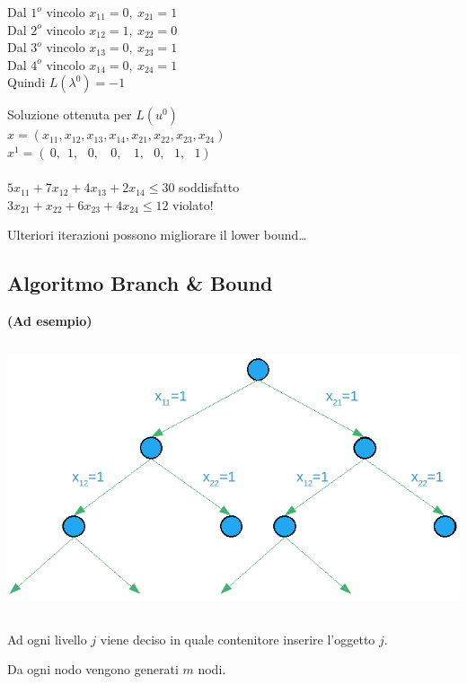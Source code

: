 Dal $1^{o}$ vincolo $x_{11}=0,\ x_{21}=1$\\
Dal $2^{o}$ vincolo $x_{12}=1,\ x_{22}=0$\\
Dal $3^{o}$ vincolo $x_{13}=0,\ x_{23}=1$\\
Dal $4^{o}$ vincolo $x_{14}=0,\ x_{24}=1$\\

Quindi $L(\lambda^{0})=-1$

Soluzione ottenuta per $L(u^{0})$\\
$x=(x_{11},x_{12},x_{13},x_{14},x_{21},x_{22},x_{23},x_{24})$\\
$x^{1}=(\ 0,\ \ 1,\ \ \ 0,\ \ \ \ 0,\ \ \ \ 1,\ \ \ 0,\ \ \ 1,\ \ \ 1)$\\\\
$5x_{11}+7x_{12}+4x_{13}+2x_{14}\le 30$ soddisfatto\\
$3x_{21}+x_{22}+6x_{23}+4x_{24}\le 12$ violato!

Ulteriori iterazioni possono migliorare il lower bound\dots

\subsection{Algoritmo Branch \& Bound}
\textbf{(Ad esempio)}

\centerline{\includegraphics[height=8cm]{images/graph26.png}}
Ad ogni livello $j$ viene deciso in quale contenitore inserire l'oggetto $j$.

Da ogni nodo vengono generati $m$ nodi.